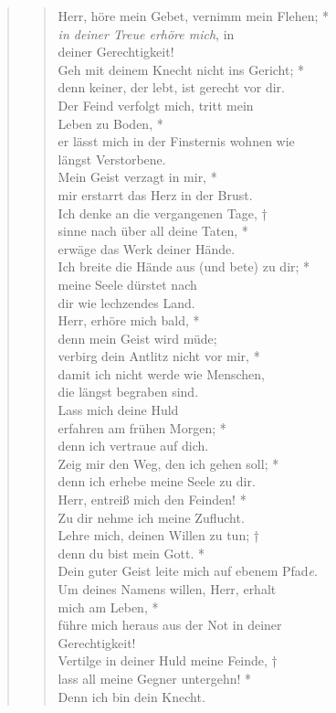 \begin{quote}

\begin{verse}
 Herr, höre mein Gebet, vernimm mein Flehen; *\\
\textit{in deiner Treue erhöre mich}, in \\deiner Gerechtigkeit!\\
\vin Geh mit deinem Knecht nicht ins Gericht; *\\
\vin denn keiner, der lebt, ist gerecht vor dir. \\
Der Feind verfolgt mich, tritt mein \\ Leben zu Boden, *\\
er lässt mich in der Finsternis wohnen wie \\ längst Verstorbene. \\
\vin Mein Geist verzagt in mir, *\\
\vin mir erstarrt das Herz in der Brust. \\
Ich denke an die vergangenen Tage, †\\
sinne nach über all deine Taten, *\\ erwäge das Werk deiner Hände. \\
\vin Ich breite die Hände aus (und bete) zu dir; *\\
\vin meine Seele dürstet nach\\ \vin  dir wie lechzendes Land. \\
Herr, erhöre mich bald, *\\
denn mein Geist wird müde; \\
\vin verbirg dein Antlitz nicht vor mir, * \\
\vin  damit ich nicht werde wie Menschen, \\ \vin die längst begraben sind.\\
Lass mich deine Huld \\erfahren am frühen Morgen; *\\
denn ich vertraue auf dich. \\
\vin Zeig mir den Weg, den ich gehen soll; *\\ \vin denn ich erhebe meine Seele zu dir. \\
Herr, entreiß mich den Feinden! *\\
Zu dir nehme ich meine Zuflucht.\\
\vin Lehre mich, deinen Willen zu tun; †\\ \vin denn  du bist mein Gott. *\\
\vin Dein guter Geist leite mich auf ebenem Pfad\textit{e}.\\ 
Um deines Namens willen, Herr, erhalt\\mich am Leben, *\\
führe mich heraus aus der Not in deiner\\ Gerechtigkeit!\\
\vin Vertilge in deiner Huld meine Feinde, †\\
\vin lass all meine Gegner untergehn! * \\ \vin Denn ich bin dein Knecht. \\


\end{verse}

\end{quote}
